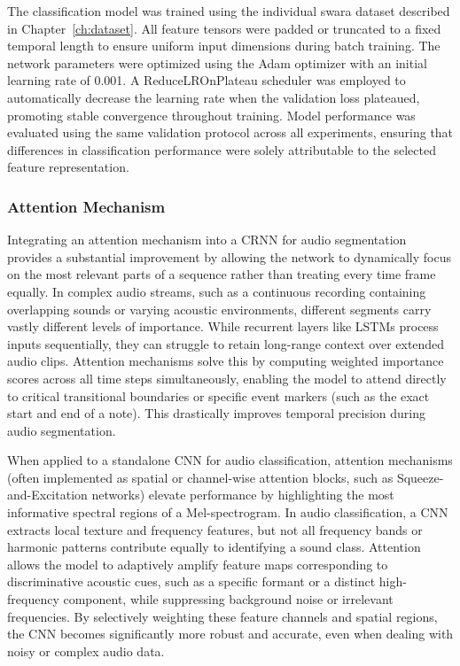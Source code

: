 The classification model was trained using the individual swara dataset described in Chapter~\ref{ch:dataset}. All feature tensors were padded or truncated to a fixed temporal length to ensure uniform input dimensions during batch training. The network parameters were optimized using the Adam optimizer with an initial learning rate of 0.001. A ReduceLROnPlateau scheduler was employed to automatically decrease the learning rate when the validation loss plateaued, promoting stable convergence throughout training. Model performance was evaluated using the same validation protocol across all experiments, ensuring that differences in classification performance were solely attributable to the selected feature representation.

\subsubsection*{Attention Mechanism}

Integrating an attention mechanism into a CRNN for audio segmentation provides a substantial improvement by allowing the network to dynamically focus on the most relevant parts of a sequence rather than treating every time frame equally. In complex audio streams, such as a continuous recording containing overlapping sounds or varying acoustic environments, different segments carry vastly different levels of importance. While recurrent layers like LSTMs process inputs sequentially, they can struggle to retain long-range context over extended audio clips. Attention mechanisms solve this by computing weighted importance scores across all time steps simultaneously, enabling the model to attend directly to critical transitional boundaries or specific event markers (such as the exact start and end of a note). This drastically improves temporal precision during audio segmentation.

When applied to a standalone CNN for audio classification, attention mechanisms (often implemented as spatial or channel-wise attention blocks, such as Squeeze-and-Excitation networks) elevate performance by highlighting the most informative spectral regions of a Mel-spectrogram. In audio classification, a CNN extracts local texture and frequency features, but not all frequency bands or harmonic patterns contribute equally to identifying a sound class. Attention allows the model to adaptively amplify feature maps corresponding to discriminative acoustic cues, such as a specific formant or a distinct high-frequency component, while suppressing background noise or irrelevant frequencies. By selectively weighting these feature channels and spatial regions, the CNN becomes significantly more robust and accurate, even when dealing with noisy or complex audio data.


